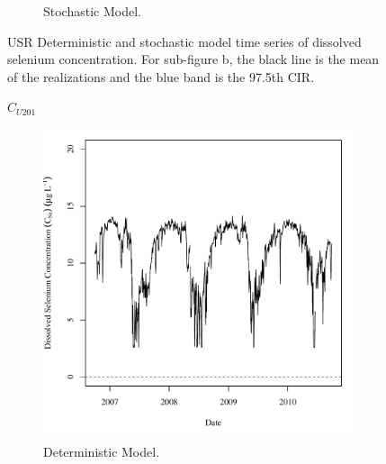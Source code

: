 \begin{linenumbers}
\begin{landscape}
\begin{figure}
\begin{subfigure}{0.7\textwidth}
			\caption{Stochastic Model.}
		\end{subfigure}
		\caption[USR Deterministic and stochastic model time series of dissolved selenium concentration.]{USR Deterministic and stochastic model time series of dissolved selenium concentration.  For sub-figure b, the black line is the mean of the realizations and the blue band is the 97.5th CIR.}
		\label{fig:concCSeTS_US}
	\end{figure}
\end{landscape}

\subfiguremid
\begin{landscape}
	\begin{figure}
		$ C_{U201} $
		\begin{subfigure}{0.7\textwidth}
			\centering
			\includegraphics[width=\tableCustomSize]{"Figures/Results_USR/Deterministic/c TS U201"}
			\caption{Deterministic Model.}
		\end{subfigure}%
		\begin{subfigure}{0.7\textwidth}
			\centering

\end{subfigure}
\end{figure}
\end{landscape}
\end{linenumbers}
